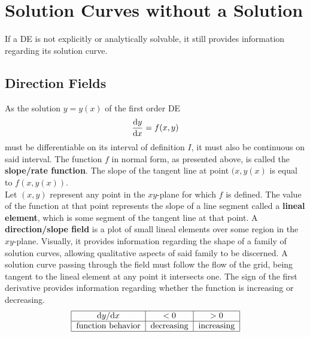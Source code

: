 \documentclass[./Differential Equations.tex]{subfiles}
\begin{document}
	\section{Solution Curves without a Solution}
		If a DE is not explicitly or analytically solvable, it still provides information regarding its solution curve.
		\subsection{Direction Fields}
				As the solution \(y = y(x)\) of the first order DE
					\[\dv{y}{x} = f(x, y)\]
					must be differentiable on its interval of definition \(I\), it must also be continuous on said interval. The function \(f\) in normal form, as presented above, is called the \textbf{slope/rate function}. The slope of the tangent line at point \((x, y(x)\) is equal to \(f(x, y(x))\). \\
				Let \((x, y)\) represent any point in the \(xy\)-plane for which \(f\) is defined. The value of the function at that point represents the slope of a line segment called a \textbf{lineal element}, which is some segment of the tangent line at that point.
				A \textbf{direction/slope field} is a plot of small lineal elements over some region in the \(xy\)-plane. Visually, it provides information regarding the shape of a family of solution curves, allowing qualitative aspects of said family to be discerned. A solution curve passing through the field must follow the flow of the grid, being tangent to the lineal element at any point it intersects one.
				The sign of the first derivative provides information regarding whether the function is increasing or decreasing.
					\[\begin{tabular}{|c|c|c|}\hline
						\(\dv*{y}{x}\) & \(< 0\) & \(> 0\) \\\hline
						function behavior & decreasing & increasing \\\hline
					\end{tabular}\]
\end{document}
